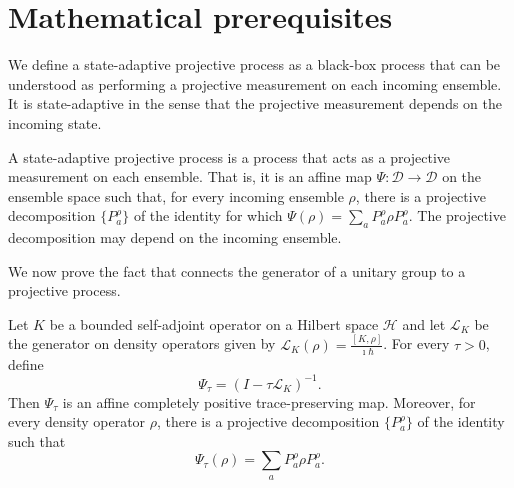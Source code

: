 \documentclass{techbrief}
\begin{document}
\section{Mathematical prerequisites}

We define a state-adaptive projective process as a black-box process that can be understood as performing a projective measurement on each incoming ensemble. It is state-adaptive in the sense that the projective measurement depends on the incoming state.
\begin{defn}
	A state-adaptive projective process is a process that acts as a projective measurement on each ensemble. That is, it is an affine map $\Psi:\mathcal{D}\to\mathcal{D}$ on the ensemble space such that, for every incoming ensemble $\rho$, there is a projective decomposition $\{P_a^\rho\}$ of the identity for which $\Psi(\rho)=\sum_aP_a^\rho\rho P_a^\rho$. The projective decomposition may depend on the incoming ensemble.
\end{defn}

We now prove the fact that connects the generator of a unitary group to a projective process.

\begin{prop}\label{UNIT-RES-PROJ}
	Let $K$ be a bounded self-adjoint operator on a Hilbert space $\mathcal{H}$ and let $\mathcal{L}_K$ be the generator on density operators given by $\mathcal{L}_K(\rho)=\frac{[K,\rho]}{\imath\hbar}$. For every $\tau>0$, define
	\begin{equation}
		\Psi_\tau=(I-\tau\mathcal{L}_K)^{-1}.
	\end{equation}
	Then $\Psi_\tau$ is an affine completely positive trace-preserving map. Moreover, for every density operator $\rho$, there is a projective decomposition $\{P_a^\rho\}$ of the identity such that
	\begin{equation}
		\Psi_\tau(\rho)=\sum_aP_a^\rho\rho P_a^\rho.
	\end{equation}
\end{prop}
\end{document}
